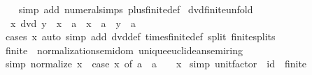 \begin{isabellebody}
%
\isadelimproof
\ \ %
\endisadelimproof
%
\isatagproof
{}\isamarkupfalse%
\ {\isacharparenleft}{\kern0pt}simp\ add{\isacharcolon}{\kern0pt}\ numeral{\isachardot}{\kern0pt}simps\ plus{\isacharunderscore}{\kern0pt}finite{\isacharunderscore}{\kern0pt}{}{\isacharunderscore}{\kern0pt}def{\isacharparenright}{\kern0pt}%
\endisatagproof
{\isafoldproof}%
%
\isadelimproof
\isanewline
%
\endisadelimproof
\isanewline
{}\isamarkupfalse%
\ dvd{\isacharunderscore}{\kern0pt}finite{\isacharunderscore}{\kern0pt}{}{\isacharunderscore}{\kern0pt}unfold{\isacharcolon}{\kern0pt}\isanewline
\ \ {\isachardoublequoteopen}x\ dvd\ y\ {\isasymlongleftrightarrow}\ x\ {\isacharequal}{\kern0pt}\ a\ {\isasymor}\ x\ {\isacharequal}{\kern0pt}\ a\ {\isasymor}\ y\ {\isacharequal}{\kern0pt}\ a\isanewline
%
\isadelimproof
\ \ %
\endisadelimproof
%
\isatagproof
{}\isamarkupfalse%
\ {\isacharparenleft}{\kern0pt}cases\ x{\isacharparenright}{\kern0pt}\ {\isacharparenleft}{\kern0pt}auto\ simp\ add{\isacharcolon}{\kern0pt}\ dvd{\isacharunderscore}{\kern0pt}def\ times{\isacharunderscore}{\kern0pt}finite{\isacharunderscore}{\kern0pt}{}{\isacharunderscore}{\kern0pt}def\ split{\isacharcolon}{\kern0pt}\ finite{\isacharunderscore}{\kern0pt}{}{\isachardot}{\kern0pt}splits{\isacharparenright}{\kern0pt}%
\endisatagproof
{\isafoldproof}%
%
\isadelimproof
\isanewline
%
\endisadelimproof
\isanewline
{}\isamarkupfalse%
\ finite{\isacharunderscore}{\kern0pt}{}\ {\isacharcolon}{\kern0pt}{\isacharcolon}{\kern0pt}\ {\isachardoublequoteopen}{\isacharbraceleft}{\kern0pt}normalization{\isacharunderscore}{\kern0pt}semidom{\isacharcomma}{\kern0pt}\ unique{\isacharunderscore}{\kern0pt}euclidean{\isacharunderscore}{\kern0pt}semiring{\isacharbraceright}{\kern0pt}{\isachardoublequoteclose}\ \isanewline
{}\isamarkupfalse%
\ {\isacharbrackleft}{\kern0pt}simp{\isacharbrackright}{\kern0pt}{\isacharcolon}{\kern0pt}\ {\isachardoublequoteopen}normalize\ x\ {\isacharequal}{\kern0pt}\ {\isacharparenleft}{\kern0pt}case\ x\ of\ a\ {\isasymRightarrow}\ a\ {\isacharbar}{\kern0pt}\ {\isacharunderscore}{\kern0pt}\ {\isasymRightarrow}\ x{\isacharparenright}{\kern0pt}{\isachardoublequoteclose}\isanewline
{}\isamarkupfalse%
\ {\isacharbrackleft}{\kern0pt}simp{\isacharbrackright}{\kern0pt}{\isacharcolon}{\kern0pt}\ {\isachardoublequoteopen}unit{\isacharunderscore}{\kern0pt}factor\ {\isacharequal}{\kern0pt}\ {\isacharparenleft}{\kern0pt}id\ {\isacharcolon}{\kern0pt}{\isacharcolon}{\kern0pt}\ finite{\isacharunderscore}{\kern0pt}{}\ {\isasymRightarrow}\ {\isacharunderscore}{\kern0pt}{\isacharparenright}{\kern0pt}{\isachardoublequoteclose}\isanewline

\end{isabellebody}
